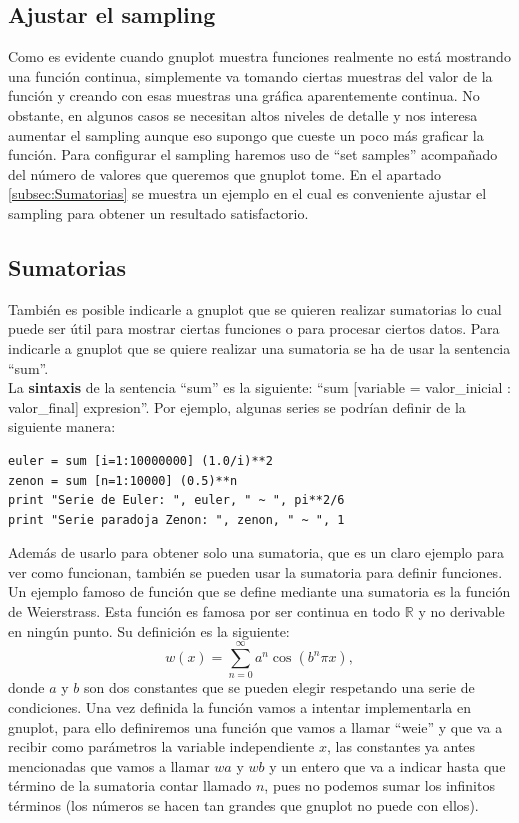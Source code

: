 \documentclass[11pt,a4paper,twoside,pdf]{article}
\numberwithin{equation}{section}
\begin{document}
\subsection{Ajustar el sampling\label{subsec:Sampling}}

Como es evidente cuando gnuplot muestra funciones realmente no está mostrando una función continua, simplemente va tomando ciertas muestras del valor de la función y creando con esas muestras una gráfica aparentemente continua. No obstante, en algunos casos se necesitan altos niveles de detalle y nos interesa aumentar el sampling aunque eso supongo que cueste un poco más graficar la función. Para configurar el sampling haremos uso de ``set samples'' acompañado del número de valores que queremos que gnuplot tome. En el apartado \ref{subsec:Sumatorias} se muestra un ejemplo en el cual es conveniente ajustar el sampling para obtener un resultado satisfactorio.

\subsection{Sumatorias\label{subsec:Sumatorias}}

También es posible indicarle a gnuplot que se quieren realizar sumatorias lo cual puede ser útil para mostrar ciertas funciones o para procesar ciertos datos. Para indicarle a gnuplot que se quiere realizar una sumatoria se ha de usar la sentencia ``sum''. \\

La \textbf{sintaxis} de la sentencia ``sum'' es la siguiente: ``sum [variable = valor\_inicial : valor\_final] expresion''. Por ejemplo, algunas series se podrían definir de la siguiente manera:

\begin{lstlisting}[language=Gnuplot]
euler = sum [i=1:10000000] (1.0/i)**2
zenon = sum [n=1:10000] (0.5)**n
print "Serie de Euler: ", euler, " ~ ", pi**2/6
print "Serie paradoja Zenon: ", zenon, " ~ ", 1
\end{lstlisting}

Además de usarlo para obtener solo una sumatoria, que es un claro ejemplo para ver como funcionan, también se pueden usar la sumatoria para definir funciones. Un ejemplo famoso de función que se define mediante una sumatoria es la función de Weierstrass. Esta función es famosa por ser continua en todo $\mathbb{R}$ y no derivable en ningún punto. Su definición es la siguiente:
\[
	w(x) = \sum_{n=0}^{\infty} a^n \cos\left( b^n \pi x  \right) 
,\]donde $a$ y $b$ son dos constantes que se pueden elegir respetando una serie de condiciones. Una vez definida la función vamos a intentar implementarla en gnuplot, para ello definiremos una función que vamos a llamar ``weie'' y que va a recibir como parámetros la variable independiente $x$, las constantes ya antes mencionadas que vamos a llamar $wa$ y $wb$ y un entero que va a indicar hasta que término de la sumatoria contar llamado $n$, pues no podemos sumar los infinitos términos (los números se hacen tan grandes que gnuplot no puede con ellos).
\end{document}
